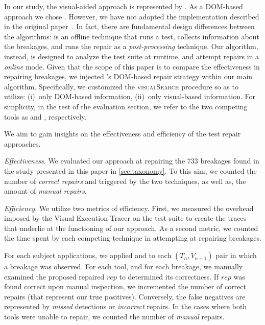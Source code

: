 In our study, the visual-aided approach is represented by \tool. As a DOM-based approach we chose \water. However, we have not adopted the implementation described in the original paper~\cite{Choudhary:2011:WWA:2002931.2002935}. In fact, there are fundamental design differences between the algorithms: \water is an offline technique that runs a test, collects information about the breakages, and runs the repair as a \textit{post-processing} technique. Our algorithm, instead, is designed to analyze the test suite at runtime, and attempt repairs in a \textit{online} mode. %
Given that the scope of this paper is to compare the effectiveness in repairing breakages, we injected \water's DOM-based repair strategy within our main algorithm. Specifically, we customized the \textsc{visualSearch} procedure so as to utilize: (i)~only DOM-based information, (ii)~only visual-based information. For simplicity, in the rest of the evaluation section, we refer to the two competing tools as \water and \tool, respectively.

We aim to gain insights on the effectiveness and efficiency of the test repair approaches.

\noindent
\emph{Effectiveness}.
We evaluated our approach at repairing the 733 breakages found in the study presented in this paper in \autoref{sec:taxonomy}.
To this aim, we counted the number of \textit{correct repairs} and triggered by the two techniques, as well as, the amount of \textit{manual repairs}.

\noindent
\emph{Efficiency}.
We utilize two metrics of efficiency.
First, we measured the overhead imposed by the Visual Execution Tracer on the test suite to create the traces that underlie at the functioning of our approach.
As a second metric, we counted the time spent by each competing technique in attempting at repairing breakages. 

\label{sec:procedure}
For each subject applications, we applied \water and \tool to each $(T_n,V_{n+1})$ pair in which a breakage was observed. For each tool, and for each breakage, we manually examined the proposed repaired $rep$ to determined its correctness. If $rep$ was found correct upon manual inspection, we incremented the number of correct repairs (that represent our true positives). Conversely, the false negatives are represented by \textit{missed} detections or \textit{incorrect} repairs.
In the cases where both tools were unable to repair, we counted the number of \textit{manual} repairs.

